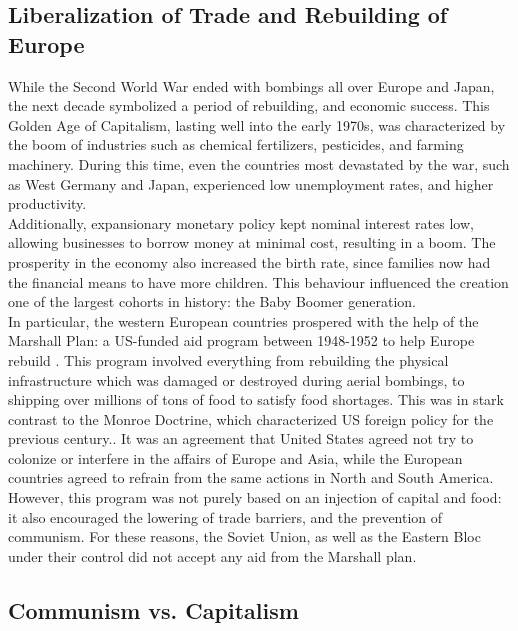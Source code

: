 \documentclass[12pt]{article}
\begin{document}
\subsection{Liberalization of Trade and Rebuilding of Europe}

While the Second World War ended with bombings all over Europe and Japan, the next decade symbolized a period of rebuilding, and economic success. This Golden Age of Capitalism, lasting well into the early 1970s, was characterized by the boom of industries such as chemical fertilizers, pesticides, and farming machinery\cite{9}. During this time, even the countries most devastated by the war, such as West Germany and Japan, experienced low unemployment rates, and higher productivity\cite{10}.\\

Additionally, expansionary monetary policy kept nominal interest rates low, allowing businesses to borrow money at minimal cost, resulting in a boom\cite{10}. The prosperity in the economy also increased the birth rate, since families now had the financial means to have more children. This behaviour influenced the creation one of the largest cohorts in history: the Baby Boomer generation\cite{10}.\\

In particular, the western European countries prospered with the help of the Marshall Plan: a US-funded aid program between 1948-1952 to help Europe rebuild \cite{11}. This program involved everything from rebuilding the physical infrastructure which was damaged or destroyed during aerial bombings, to shipping over millions of tons of food to satisfy food shortages. This was in stark contrast to the Monroe Doctrine, which characterized US foreign policy for the previous century.. It was an agreement that United States agreed not try to colonize or interfere in the affairs of Europe and Asia, while the European countries agreed to refrain from the same actions in North and South America\cite{12}. However, this program was not purely based on an injection of capital and food: it also encouraged the lowering of trade barriers, and the prevention of communism\cite{11}. For these reasons, the Soviet Union, as well as the Eastern Bloc under their control did not accept any aid from the Marshall plan\cite{11}.

\subsection{Communism vs. Capitalism}
\end{document}
